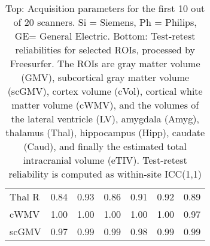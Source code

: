 \begin{table}
\begin{tabular}{lllllll}
Thal R                &                 0.84 &                 0.93 &               0.86 &                0.91 &                0.92 &                0.89 \\
cWMV                  &                 1.00 &                 1.00 &               1.00 &                1.00 &                1.00 &                0.97 \\
scGMV                 &                 0.97 &                 0.99 &               0.99 &                0.98 &                0.99 &                0.99 \\
\bottomrule
\end{tabular}
\caption{Top: Acquisition parameters for the first 10 out of 20 scanners. Si = Siemens, Ph = Philips, GE= General Electric. Bottom: Test-retest reliabilities for selected ROIs, processed by Freesurfer. The ROIs are gray matter volume (GMV), subcortical gray matter volume (scGMV), cortex volume (cVol), cortical white matter volume (cWMV), and the volumes of the lateral ventricle (LV), amygdala (Amyg), thalamus (Thal), hippocampus (Hipp), caudate (Caud), and finally the estimated total intracranial volume (eTIV). Test-retest reliability is computed as within-site ICC(1,1)} 
\label{tab:acquisition1}

\end{table}